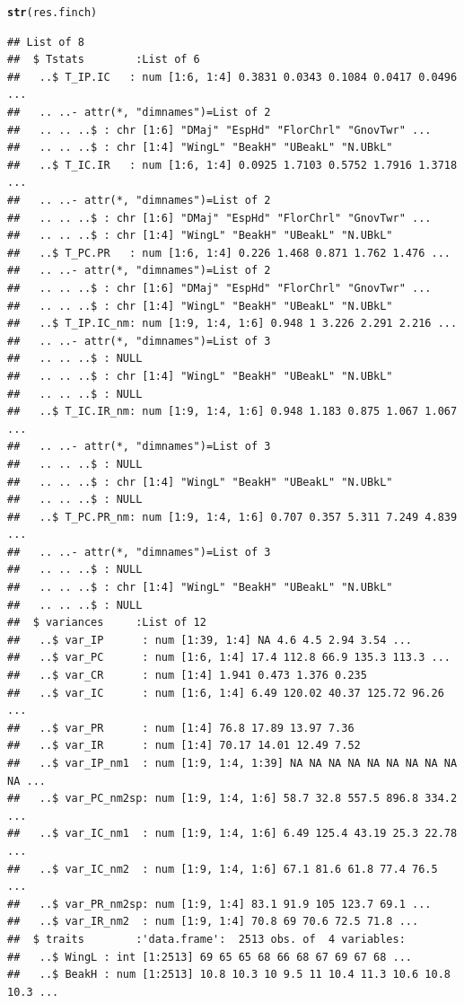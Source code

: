 \documentclass[12pt]{article}\usepackage[]{graphicx}\usepackage[]{color}
\makeatletter
\newcommand{\hlstd}[1]{\textcolor[rgb]{0.345,0.345,0.345}{#1}}%
\newcommand{\hlkwd}[1]{\textcolor[rgb]{0.737,0.353,0.396}{\textbf{#1}}}%
\newenvironment{kframe}{%
 \def\at@end@of@kframe{}%
 \ifinner\ifhmode%
  \def\at@end@of@kframe{\end{minipage}}%
  \begin{minipage}{\columnwidth}%
 \fi\fi%
 \def\FrameCommand##1{\hskip\@totalleftmargin \hskip-\fboxsep
 \colorbox{shadecolor}{##1}\hskip-\fboxsep
     \hskip-\linewidth \hskip-\@totalleftmargin \hskip\columnwidth}%
 \MakeFramed {\advance\hsize-\width
   \@totalleftmargin\z@ \linewidth\hsize
   \@setminipage}}%
 {\par\unskip\endMakeFramed%
 \at@end@of@kframe}
\newenvironment{knitrout}{}{} %
\makeatother
\begin{document}
\begin{knitrout}
\begin{kframe}
\begin{alltt}
\hlkwd{str}\hlstd{(res.finch)}
\end{alltt}
\begin{verbatim}
## List of 8
##  $ Tstats        :List of 6
##   ..$ T_IP.IC   : num [1:6, 1:4] 0.3831 0.0343 0.1084 0.0417 0.0496 ...
##   .. ..- attr(*, "dimnames")=List of 2
##   .. .. ..$ : chr [1:6] "DMaj" "EspHd" "FlorChrl" "GnovTwr" ...
##   .. .. ..$ : chr [1:4] "WingL" "BeakH" "UBeakL" "N.UBkL"
##   ..$ T_IC.IR   : num [1:6, 1:4] 0.0925 1.7103 0.5752 1.7916 1.3718 ...
##   .. ..- attr(*, "dimnames")=List of 2
##   .. .. ..$ : chr [1:6] "DMaj" "EspHd" "FlorChrl" "GnovTwr" ...
##   .. .. ..$ : chr [1:4] "WingL" "BeakH" "UBeakL" "N.UBkL"
##   ..$ T_PC.PR   : num [1:6, 1:4] 0.226 1.468 0.871 1.762 1.476 ...
##   .. ..- attr(*, "dimnames")=List of 2
##   .. .. ..$ : chr [1:6] "DMaj" "EspHd" "FlorChrl" "GnovTwr" ...
##   .. .. ..$ : chr [1:4] "WingL" "BeakH" "UBeakL" "N.UBkL"
##   ..$ T_IP.IC_nm: num [1:9, 1:4, 1:6] 0.948 1 3.226 2.291 2.216 ...
##   .. ..- attr(*, "dimnames")=List of 3
##   .. .. ..$ : NULL
##   .. .. ..$ : chr [1:4] "WingL" "BeakH" "UBeakL" "N.UBkL"
##   .. .. ..$ : NULL
##   ..$ T_IC.IR_nm: num [1:9, 1:4, 1:6] 0.948 1.183 0.875 1.067 1.067 ...
##   .. ..- attr(*, "dimnames")=List of 3
##   .. .. ..$ : NULL
##   .. .. ..$ : chr [1:4] "WingL" "BeakH" "UBeakL" "N.UBkL"
##   .. .. ..$ : NULL
##   ..$ T_PC.PR_nm: num [1:9, 1:4, 1:6] 0.707 0.357 5.311 7.249 4.839 ...
##   .. ..- attr(*, "dimnames")=List of 3
##   .. .. ..$ : NULL
##   .. .. ..$ : chr [1:4] "WingL" "BeakH" "UBeakL" "N.UBkL"
##   .. .. ..$ : NULL
##  $ variances     :List of 12
##   ..$ var_IP      : num [1:39, 1:4] NA 4.6 4.5 2.94 3.54 ...
##   ..$ var_PC      : num [1:6, 1:4] 17.4 112.8 66.9 135.3 113.3 ...
##   ..$ var_CR      : num [1:4] 1.941 0.473 1.376 0.235
##   ..$ var_IC      : num [1:6, 1:4] 6.49 120.02 40.37 125.72 96.26 ...
##   ..$ var_PR      : num [1:4] 76.8 17.89 13.97 7.36
##   ..$ var_IR      : num [1:4] 70.17 14.01 12.49 7.52
##   ..$ var_IP_nm1  : num [1:9, 1:4, 1:39] NA NA NA NA NA NA NA NA NA NA ...
##   ..$ var_PC_nm2sp: num [1:9, 1:4, 1:6] 58.7 32.8 557.5 896.8 334.2 ...
##   ..$ var_IC_nm1  : num [1:9, 1:4, 1:6] 6.49 125.4 43.19 25.3 22.78 ...
##   ..$ var_IC_nm2  : num [1:9, 1:4, 1:6] 67.1 81.6 61.8 77.4 76.5 ...
##   ..$ var_PR_nm2sp: num [1:9, 1:4] 83.1 91.9 105 123.7 69.1 ...
##   ..$ var_IR_nm2  : num [1:9, 1:4] 70.8 69 70.6 72.5 71.8 ...
##  $ traits        :'data.frame':	2513 obs. of  4 variables:
##   ..$ WingL : int [1:2513] 69 65 65 68 66 68 67 69 67 68 ...
##   ..$ BeakH : num [1:2513] 10.8 10.3 10 9.5 11 10.4 11.3 10.6 10.8 10.3 ...

\end{verbatim}
\end{kframe}
\end{knitrout}
\end{document}
